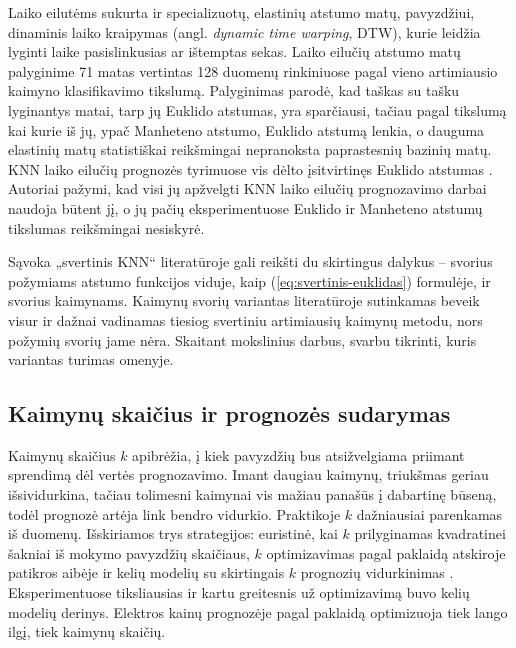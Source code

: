 Laiko eilutėms sukurta ir specializuotų, elastinių atstumo matų, pavyzdžiui, dinaminis laiko kraipymas (angl. \textit{dynamic time warping}, DTW), kurie leidžia lyginti laike pasislinkusias ar ištemptas sekas.
Laiko eilučių atstumo matų palyginime \cite{paparrizos2020} 71 matas vertintas 128 duomenų rinkiniuose pagal vieno artimiausio kaimyno klasifikavimo tikslumą.
Palyginimas parodė, kad taškas su tašku lyginantys matai, tarp jų Euklido atstumas, yra sparčiausi, tačiau pagal tikslumą kai kurie iš jų, ypač Manheteno atstumo, Euklido atstumą lenkia, o dauguma elastinių matų statistiškai reikšmingai nepranoksta paprastesnių bazinių matų.
KNN laiko eilučių prognozės tyrimuose vis dėlto įsitvirtinęs Euklido atstumas \cite{martinez2019}.
Autoriai pažymi, kad visi jų apžvelgti KNN laiko eilučių prognozavimo darbai naudoja būtent jį, o jų pačių eksperimentuose Euklido ir Manheteno atstumų tikslumas reikšmingai nesiskyrė.

Sąvoka „svertinis KNN“ literatūroje gali reikšti du skirtingus dalykus -- svorius požymiams atstumo funkcijos viduje, kaip (\ref{eq:svertinis-euklidas}) formulėje, ir svorius kaimynams.
Kaimynų svorių variantas literatūroje sutinkamas beveik visur ir dažnai vadinamas tiesiog svertiniu artimiausių kaimynų metodu, nors požymių svorių jame nėra.
Skaitant mokslinius darbus, svarbu tikrinti, kuris variantas turimas omenyje.


\subsection{Kaimynų skaičius ir prognozės sudarymas}

Kaimynų skaičius $k$ apibrėžia, į kiek pavyzdžių bus atsižvelgiama priimant sprendimą dėl vertės prognozavimo.
Imant daugiau kaimynų, triukšmas geriau išsividurkina, tačiau tolimesni kaimynai vis mažiau panašūs į dabartinę būseną, todėl prognozė artėja link bendro vidurkio.
Praktikoje $k$ dažniausiai parenkamas iš duomenų.
Išskiriamos trys strategijos: euristinė, kai $k$ prilyginamas kvadratinei šakniai iš mokymo pavyzdžių skaičiaus, $k$ optimizavimas pagal paklaidą atskiroje patikros aibėje ir kelių modelių su skirtingais $k$ prognozių vidurkinimas \cite{martinez2019}.
Eksperimentuose tiksliausias ir kartu greitesnis už optimizavimą buvo kelių modelių derinys.
Elektros kainų prognozėje \cite{troncoso2007} pagal paklaidą optimizuoja tiek lango ilgį, tiek kaimynų skaičių.

